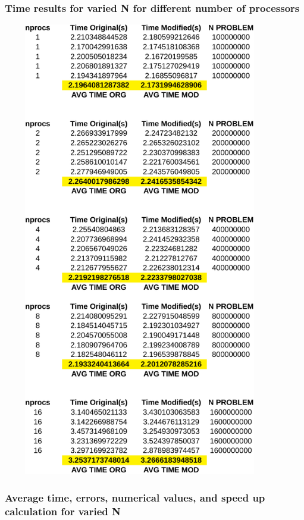 \documentclass[12pt]{article}
\begin{document}
	\subsubsection{Time results for varied N for different number of processors} 
	\begin{center}	
	\includegraphics[width = 120mm,height = 200mm]{variedN_alltime-crop}
	\end{center}

	\subsubsection{Average time, errors, numerical values, and speed up calculation for varied N}
\end{document}

